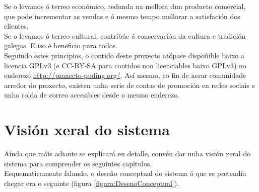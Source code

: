  Se o levamos ó terreo económico, redunda na mellora dun producto comercial,
 que pode incrementar as vendas e ó mesmo tempo mellorar a satisfación dos
 clientes. \\

 Se o levamos ó terreo cultural, contribúe á conservación da cultura e tradición
 galegas. E iso é beneficio para todos. \\

 Seguindo estes principios, o contido deste proxecto atópase dispoñible baixo a
 licencia GPLv3 (e CC-BY-SA para contidos non licenciables baixo GPLv3) no
 enderezo \url{http://proxecto-puding.org/}. Así mesmo, co fin de xerar
 comunidade arredor do proxecto, existen unha serie de contas de promoción en
 redes sociais e unha rolda de correo accesibles desde o mesmo enderezo.

\section{Visión xeral do sistema}

 Aínda que máis adiante se explicará en detalle, convén dar unha visión xeral
 do sistema para comprender os seguintes capítulos. \\

 Esquematicamente falando, o deseño conceptual do sistema ó que se pretendía
 chegar era o seguinte (figura \ref{figura:DesenoConceptual}).

